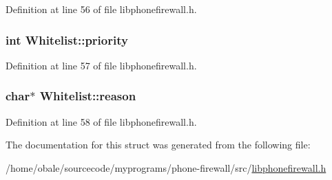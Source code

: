 Definition at line 56 of file libphonefirewall.h.\hypertarget{structWhitelist_a88dab00804dbe50d9255e0fa75d1438}{
\subsubsection{\setlength{\rightskip}{0pt plus 5cm}int {\bf Whitelist::priority}}}
\label{structWhitelist_a88dab00804dbe50d9255e0fa75d1438}




Definition at line 57 of file libphonefirewall.h.\hypertarget{structWhitelist_22d667946147519356f386dee8a05a17}{
\subsubsection{\setlength{\rightskip}{0pt plus 5cm}char$\ast$ {\bf Whitelist::reason}}}
\label{structWhitelist_22d667946147519356f386dee8a05a17}




Definition at line 58 of file libphonefirewall.h.

The documentation for this struct was generated from the following file:\begin{CompactItemize}
\item 
/home/obale/sourcecode/myprograms/phone-firewall/src/\hyperlink{libphonefirewall_8h}{libphonefirewall.h}\end{CompactItemize}
